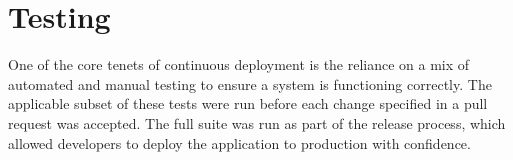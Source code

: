 \chapter{Testing}
\par
One of the core tenets of continuous deployment is the reliance on a mix of automated and manual testing to ensure a system is functioning correctly. The applicable subset of these tests were run before each change specified in a pull request was accepted. The full suite was run as part of the release process, which allowed developers to deploy the application to production with confidence.










